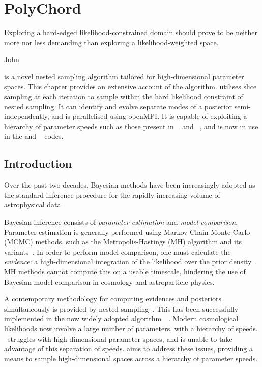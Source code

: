\chapter{PolyChord}
\label{chp:pc}

\epigraph{Exploring a hard-edged likelihood-constrained domain should prove to be neither more nor less demanding than exploring a likelihood-weighted space.}{John~\cite{skilling2006}}

\noindent 
\PolyChord{} is a novel nested sampling algorithm tailored for high-dimensional parameter spaces. This chapter provides an extensive account of the algorithm. \PolyChord{} utilises slice sampling at each iteration to sample within the hard likelihood constraint of nested sampling. It can identify and evolve separate modes of a posterior semi-independently, and is parallelised using openMPI\@. It is capable of exploiting a hierarchy of parameter speeds such as those present in \CosmoMC{}~\citep{cosmomc} and \CAMB{}~\citep{CAMB}, and is now in use in the \CosmoChord{} and \ModeChord{}~\citep{ModeChord1,ModeChord2,ModeChord3} codes. 

\section{Introduction}

Over the past two decades, Bayesian methods have been increasingly adopted as the standard inference procedure for the rapidly increasing volume of astrophysical data.

Bayesian inference consists of {\em parameter estimation\/} and {\em model comparison}.  Parameter estimation is generally performed using Markov-Chain Monte-Carlo (MCMC) methods, such as the Metropolis-Hastings (MH) algorithm and its variants~\citep{MacKay}.  In order to perform model comparison, one must calculate the {\em evidence\/}: a high-dimensional integration of the likelihood over the prior density~\citep{Sivia}.  MH methods cannot compute this on a usable timescale, hindering the use of Bayesian model comparison in cosmology and astroparticle physics.

A contemporary methodology for computing evidences and posteriors simultaneously is provided by nested sampling~\citep{skilling2006}. This has been successfully implemented in the now widely adopted algorithm \MultiNest\,~\citep{MultiNest1,MultiNest2,MultiNest3}.  Modern cosmological likelihoods now involve a large number of parameters, with a hierarchy of speeds.  \MultiNest\ struggles with high-dimensional parameter spaces, and is unable to take advantage of this separation of speeds.  \PolyChord{} aims to address these issues, providing a means to sample high-dimensional spaces across a hierarchy of parameter speeds.

